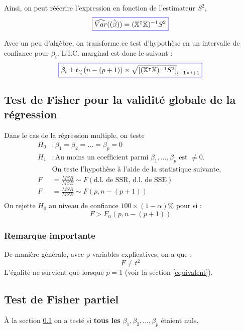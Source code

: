 \documentclass[11pt,french]{report}
\begin{document}
Ainsi, on peut réécrire l'expression en fonction de l'estimateur $S^2$, 
\begin{equation}
\label{eq:varmulti}
\color{blue}
\boxed{\color{black}
\widehat{Var}(\hat{\mathbb(\beta)}) = (\mathbb{X}^\intercal\mathbb{X})^{-1}S^2}
\end{equation}

Avec un peu d'algèbre, on transforme ce test d'hypothèse en un intervalle de confiance pour $\beta_i$. L'I.C. marginal est donc le suivant :
\begin{equation}
\label{eq:ICmulti}
\color{blue}
\boxed{\color{black}
\hat{\beta}_i \pm t_{\frac{\alpha}{n}}(n - (p+1)) \times \sqrt{[(\mathbb{X}^\intercal\mathbb{X})^{-1}S^2]}_{i+1 \times i+1} }
\end{equation}

\subsection{Test de Fisher pour la validité globale de la régression}
\label{sec:fisherT}
Dans le cas de la régression multiple, on teste 
\begin{align*}
H_0 &: \beta_1 = \beta_2 = ... = \beta_p = 0 \\
H_1 &: \text{Au moins un coefficient parmi $\beta_1,...,\beta_p$ est $\neq 0$.} \\
&\text{On teste l'hypothèse à l'aide de la statistique suivante, } \\
F &= \frac{MSR}{MSE} \sim F(\text{d.l. de SSR, d.l. de SSE}) \\
F &= \frac{MSR}{MSE} \sim F(p, n - (p+1)) \\
\end{align*}
On rejette $H_0$ au niveau de confiance $100 \times (1 - \alpha)\%$ pour si :
$$
F > F_{\alpha}(p, n-(p+1))
$$

\subsubsection*{Remarque importante}
De manière générale, avec p variables explicatives, on a que :
$$
F \neq t^2
$$
L'égalité ne survient que lorsque $p=1$ (voir la section \ref{equivalent}).

\subsection{Test de Fisher partiel}
\label{sec:testFpartiel}
À la section \ref{sec:fisherT} on a testé si \textbf{tous les} $\beta_1, \beta_2,...,\beta_p$ étaient nuls. \newline
\end{document}
